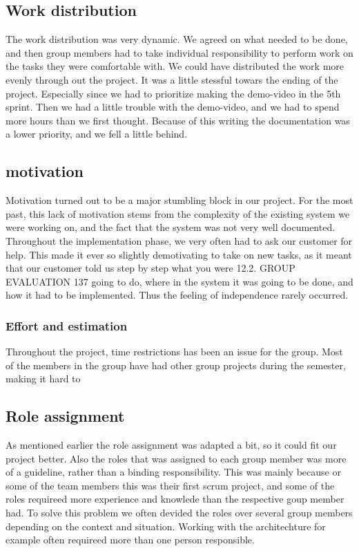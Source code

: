 \subsection{Work distribution}

The work distribution was very dynamic. We agreed on what needed to be done, and then group members had to take individual responsibility to perform work on the tasks they were comfortable with.
We could have distributed the work more evenly through out the project. 
It was a little stessful towars the ending of the project. Especially since we had to prioritize making the demo-video in the 5th sprint. Then we had a little trouble with the demo-video, and we had to spend more hours than we first thought. Because of this writing the documentation was a lower priority, and we fell a little behind.  
  
\subsection{motivation}
Motivation turned out to be a major stumbling block in our project. For the
most past, this lack of motivation stems from the complexity of the existing
system we were working on, and the fact that the system was not very well
documented. Throughout the implementation phase, we very often had to ask
our customer for help. This made it ever so slightly demotivating to take on
new tasks, as it meant that our customer told us step by step what you were
12.2. GROUP EVALUATION 137
going to do, where in the system it was going to be done, and how it had to be
implemented. Thus the feeling of independence rarely occurred.
\subsubsection{Effort and estimation}
Throughout the project, time restrictions has been an issue for the group. Most of the 
members in the group have had other group projects during the semester, making it hard to 


\subsection{Role assignment}
As mentioned earlier the role assignment was adapted a bit, so it could fit our project better. Also the roles that was assigned to each group member was more of a guideline, rather than a binding responsibility. This was mainly because or some of the team members this was their first scrum project, and some of the roles requireed more experience and knowlede than the respective goup member had. To solve this problem we often devided the roles over several group members depending on the context and situation. Working with the architechture for example often requireed more than one person responsible. 

